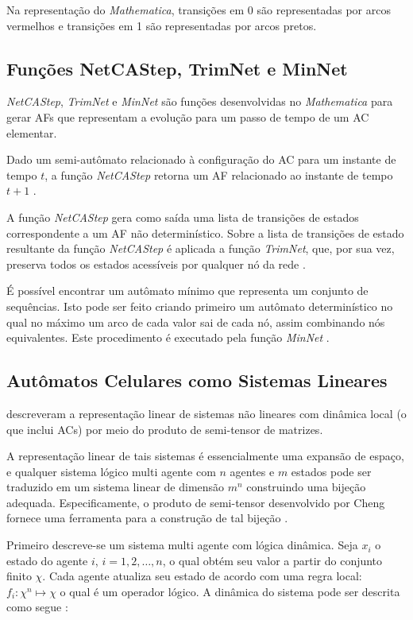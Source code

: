 \documentclass[12pt,a4paper]{article}
\begin{document}
Na representação do \textit{Mathematica}, transições em 0 são
representadas por arcos vermelhos e transições em 1 são
representadas por arcos pretos.

\subsection{Funções NetCAStep, TrimNet e MinNet}

\emph{NetCAStep}, \emph{TrimNet} e \emph{MinNet}  são
funções desenvolvidas no \textit{Mathematica} para gerar AFs
que representam a evolução para um passo de tempo de um AC
elementar.

Dado um semi-autômato relacionado à configuração do AC para
um instante de tempo $t$, a função \emph{NetCAStep} 
retorna um AF relacionado ao instante de tempo $t+1$
.

A função \emph{NetCAStep} gera como saída uma lista de transições
de estados correspondente a um AF não determinístico.
Sobre a lista de transições de estado resultante da função
\emph{NetCAStep} é aplicada a função \emph{TrimNet}, que, por sua vez,
preserva todos os estados acessíveis por qualquer nó da rede
.

É possível encontrar um autômato mínimo que representa um conjunto
de sequências. Isto pode ser feito criando primeiro um autômato
determinístico no qual no máximo um arco de cada valor sai de cada
nó, assim combinando nós equivalentes. Este procedimento é
executado pela função \emph{MinNet} .

\subsection{Autômatos Celulares como Sistemas Lineares}

 descreveram a representação linear de sistemas não
lineares com dinâmica local (o que inclui ACs) por meio do produto de
semi-tensor de matrizes.

A representação linear de tais sistemas é essencialmente uma expansão de
espaço, e qualquer sistema lógico multi agente com $n$ agentes e $m$ estados
pode ser traduzido em um sistema linear de dimensão $m^n$ construindo uma
bijeção adequada. Especificamente, o produto de semi-tensor desenvolvido
por Cheng  fornece uma ferramenta para a construção de
tal bijeção .  

Primeiro descreve-se um sistema multi agente com lógica dinâmica. Seja
$x_i$ o estado do agente $i$, $i=1,2,\ldots,n$, o qual obtém seu valor
a partir do conjunto finito $\chi$. Cada agente atualiza seu estado de acordo
com uma regra local: $f_i: \chi^n \mapsto \chi$ o qual é um operador lógico.
A dinâmica do sistema pode ser descrita como segue :
\end{document}
